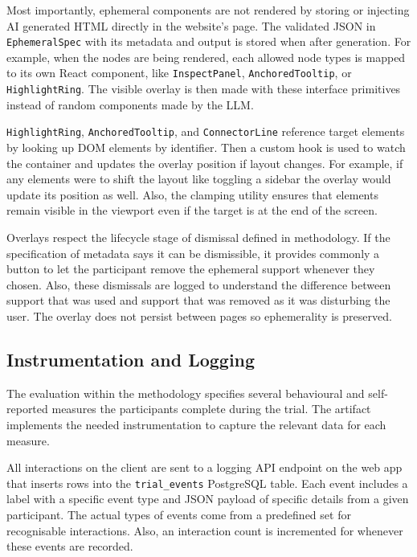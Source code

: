 Most importantly, ephemeral components are not rendered by storing or injecting AI generated HTML directly in the website's page. The validated JSON in \texttt{EphemeralSpec} with its metadata and output is stored when after generation. For example, when the nodes are being rendered, each allowed node types is mapped to its own React component, like \texttt{InspectPanel}, \texttt{AnchoredTooltip}, or \texttt{HighlightRing}. The visible overlay is then made with these interface primitives instead of random components made by the LLM.

\texttt{HighlightRing}, \texttt{AnchoredTooltip}, and \texttt{ConnectorLine} reference target elements by looking up DOM elements by identifier. Then a custom hook is used to watch the container and updates the overlay position if layout changes.  For example, if any elements were to shift the layout like toggling a sidebar the overlay would update its position as well. Also, the clamping utility ensures that elements remain visible in the viewport even if the target is at the end of the screen.

Overlays respect the lifecycle stage of dismissal defined in methodology. If the specification of metadata says it can be dismissible, it provides commonly a button to let the participant remove the ephemeral support whenever they chosen. Also, these dismissals are logged to understand the difference between support that was used and support that was removed as it was disturbing the user. The overlay does not persist between pages so ephemerality is preserved.

\subsection{Instrumentation and Logging}

The evaluation within the methodology specifies several behavioural and self-reported measures the participants complete during the trial. The artifact implements the needed instrumentation to capture the relevant data for each measure.

All interactions on the client are sent to a logging API endpoint on the web app that inserts rows into the \texttt{trial\_events} PostgreSQL table. Each event includes a label with a specific event type and JSON payload of specific details from a given participant. The actual types of events come from a predefined set for recognisable interactions. Also, an interaction count is incremented for whenever these events are recorded.

